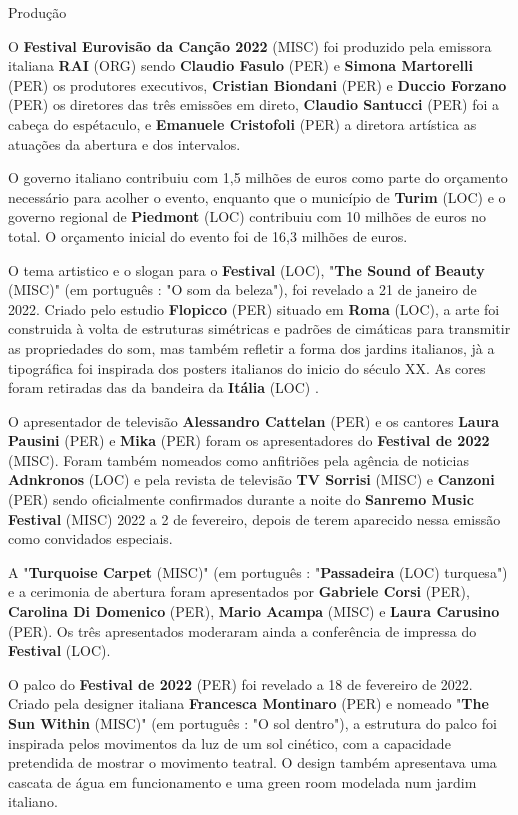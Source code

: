 \documentclass[12pt,a4paper]{article}
\begin{document}
Produção

O \textbf{Festival Eurovisão da Canção 2022} (MISC) foi produzido pela emissora italiana \textbf{RAI} (ORG) sendo \textbf{Claudio Fasulo} (PER) e \textbf{Simona Martorelli} (PER) os produtores executivos, \textbf{Cristian Biondani} (PER) e \textbf{Duccio Forzano} (PER) os diretores das três emissões em direto, \textbf{Claudio Santucci} (PER) foi a cabeça do espétaculo, e \textbf{Emanuele Cristofoli} (PER) a diretora artística as atuações da abertura e dos intervalos.

O governo italiano contribuiu com 1,5 milhões de euros como parte do orçamento necessário para acolher o evento, enquanto que o município de \textbf{Turim} (LOC) e o governo regional de \textbf{Piedmont} (LOC) contribuiu com 10 milhões de euros no total. O orçamento inicial do evento foi de 16,3 milhões de euros.

O tema artistico e o slogan para o \textbf{Festival} (LOC), "\textbf{The Sound of Beauty} (MISC)" (em português : "O som da beleza"), foi revelado a 21 de janeiro de 2022. Criado pelo estudio \textbf{Flopicco} (PER) situado em \textbf{Roma} (LOC), a arte foi construida à volta de estruturas simétricas e padrões de cimáticas para transmitir as propriedades do som, mas também refletir a forma dos jardins italianos, jà a tipográfica foi inspirada dos posters italianos do inicio do século XX. As cores foram retiradas das da bandeira da \textbf{Itália} (LOC) .

O apresentador de televisão \textbf{Alessandro Cattelan} (PER) e os cantores \textbf{Laura Pausini} (PER) e \textbf{Mika} (PER) foram os apresentadores do \textbf{Festival de 2022} (MISC). Foram também nomeados como anfitriões pela agência de noticias \textbf{Adnkronos} (LOC) e pela revista de televisão \textbf{TV Sorrisi} (MISC) e \textbf{Canzoni} (PER) sendo oficialmente confirmados durante a noite do \textbf{Sanremo Music Festival} (MISC) 2022 a 2 de fevereiro, depois de terem aparecido nessa emissão como convidados especiais.

A "\textbf{Turquoise Carpet} (MISC)" (em português : "\textbf{Passadeira} (LOC) turquesa") e a cerimonia de abertura foram apresentados por \textbf{Gabriele Corsi} (PER), \textbf{Carolina Di Domenico} (PER), \textbf{Mario Acampa} (MISC) e \textbf{Laura Carusino} (PER). Os três apresentados moderaram ainda a conferência de impressa do \textbf{Festival} (LOC).

O palco do \textbf{Festival de 2022} (PER) foi revelado a 18 de fevereiro de 2022. Criado pela designer italiana \textbf{Francesca Montinaro} (PER) e nomeado "\textbf{The Sun Within} (MISC)" (em português : "O sol dentro"), a estrutura do palco foi inspirada pelos movimentos da luz de um sol cinético, com a capacidade pretendida de mostrar o movimento teatral. O design também apresentava uma cascata de água em funcionamento e uma green room modelada num jardim italiano.
\end{document}

